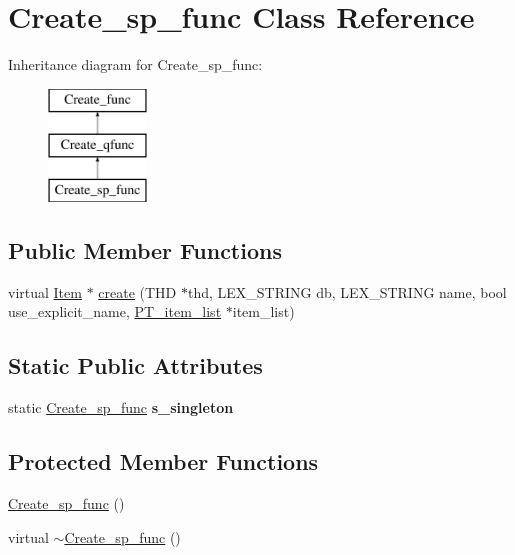 \hypertarget{classCreate__sp__func}{}\section{Create\+\_\+sp\+\_\+func Class Reference}
\label{classCreate__sp__func}
Inheritance diagram for Create\+\_\+sp\+\_\+func\+:\begin{figure}[H]
\begin{center}
\leavevmode
\includegraphics[height=3.000000cm]{classCreate__sp__func}
\end{center}
\end{figure}
\subsection*{Public Member Functions}
\begin{DoxyCompactItemize}
\item 
virtual \mbox{\hyperlink{classItem}{Item}} $\ast$ \mbox{\hyperlink{classCreate__sp__func_aee45c3ffd335d9ee3be0bf06bdc86a62}{create}} (T\+HD $\ast$thd, L\+E\+X\+\_\+\+S\+T\+R\+I\+NG db, L\+E\+X\+\_\+\+S\+T\+R\+I\+NG name, bool use\+\_\+explicit\+\_\+name, \mbox{\hyperlink{classPT__item__list}{P\+T\+\_\+item\+\_\+list}} $\ast$item\+\_\+list)
\end{DoxyCompactItemize}
\subsection*{Static Public Attributes}
\begin{DoxyCompactItemize}
\item 
\mbox{\label{classCreate__sp__func_a46072b0baa7a70159b1fe1ce856254d7}} 
static \mbox{\hyperlink{classCreate__sp__func}{Create\+\_\+sp\+\_\+func}} {\bfseries s\+\_\+singleton}
\end{DoxyCompactItemize}
\subsection*{Protected Member Functions}
\begin{DoxyCompactItemize}
\item 
\mbox{\hyperlink{classCreate__sp__func_a0fa3940ade4e8c92f2a00111cfd6fb59}{Create\+\_\+sp\+\_\+func}} ()
\item 
virtual \mbox{\hyperlink{classCreate__sp__func_a2919afb29f20fc9f0280abf7a7ae973f}{$\sim$\+Create\+\_\+sp\+\_\+func}} ()
\end{DoxyCompactItemize}


